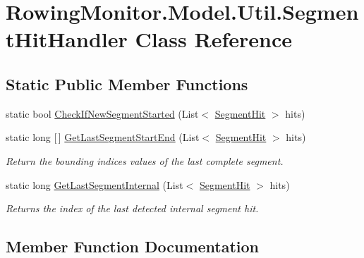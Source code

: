 \hypertarget{class_rowing_monitor_1_1_model_1_1_util_1_1_segment_hit_handler}{}\section{Rowing\+Monitor.\+Model.\+Util.\+Segment\+Hit\+Handler Class Reference}
\label{class_rowing_monitor_1_1_model_1_1_util_1_1_segment_hit_handler}
\subsection*{Static Public Member Functions}
\begin{DoxyCompactItemize}
\item 
static bool \hyperlink{class_rowing_monitor_1_1_model_1_1_util_1_1_segment_hit_handler_adbd44130a8d894cd7c21430c3eedf9e1}{Check\+If\+New\+Segment\+Started} (List$<$ \hyperlink{struct_rowing_monitor_1_1_model_1_1_util_1_1_segment_hit}{Segment\+Hit} $>$ hits)
\item 
static long \mbox{[}$\,$\mbox{]} \hyperlink{class_rowing_monitor_1_1_model_1_1_util_1_1_segment_hit_handler_a75d8b23514da843ef1eebf9e684f8094}{Get\+Last\+Segment\+Start\+End} (List$<$ \hyperlink{struct_rowing_monitor_1_1_model_1_1_util_1_1_segment_hit}{Segment\+Hit} $>$ hits)
\begin{DoxyCompactList}\small\item\em Return the bounding indices values of the last complete segment. \end{DoxyCompactList}\item 
static long \hyperlink{class_rowing_monitor_1_1_model_1_1_util_1_1_segment_hit_handler_ac73a1aebbe85844658b84fd48591c302}{Get\+Last\+Segment\+Internal} (List$<$ \hyperlink{struct_rowing_monitor_1_1_model_1_1_util_1_1_segment_hit}{Segment\+Hit} $>$ hits)
\begin{DoxyCompactList}\small\item\em Returns the index of the last detected internal segment hit. \end{DoxyCompactList}\end{DoxyCompactItemize}


\subsection{Member Function Documentation}
\mbox{\label{class_rowing_monitor_1_1_model_1_1_util_1_1_segment_hit_handler_adbd44130a8d894cd7c21430c3eedf9e1}} 

